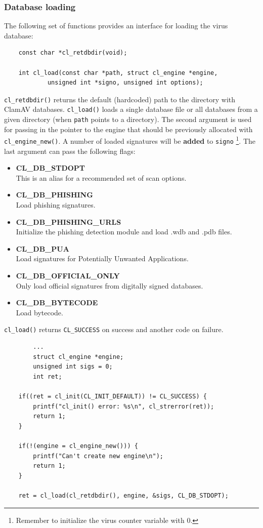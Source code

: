 \documentclass[a4paper,titlepage,12pt]{article}
\begin{document}
    \subsubsection{Database loading}
    The following set of functions provides an interface for loading
    the virus database:
    \begin{verbatim}
	const char *cl_retdbdir(void);

	int cl_load(const char *path, struct cl_engine *engine,
		    unsigned int *signo, unsigned int options);
    \end{verbatim}
    \verb+cl_retdbdir()+ returns the default (hardcoded) path to the directory
    with ClamAV databases.
    \verb+cl_load()+ loads a single database file or all databases from a
    given directory (when \verb+path+ points to a directory). The second
    argument is used for passing in the pointer to the engine that should
    be previously allocated with \verb+cl_engine_new()+. A number of loaded
    signatures will be \textbf{added} to \verb+signo+ \footnote{Remember to
    initialize the virus counter variable with 0.}. The last argument can
    pass the following flags:
    \begin{itemize}
	\item \textbf{CL\_DB\_STDOPT}\\
	This is an alias for a recommended set of scan options.
	\item \textbf{CL\_DB\_PHISHING}\\
	Load phishing signatures.
	\item \textbf{CL\_DB\_PHISHING\_URLS}\\
	Initialize the phishing detection module and load .wdb and .pdb files.
	\item \textbf{CL\_DB\_PUA}\\
	Load signatures for Potentially Unwanted Applications.
	\item \textbf{CL\_DB\_OFFICIAL\_ONLY}\\
	Only load official signatures from digitally signed databases.
	\item \textbf{CL\_DB\_BYTECODE}\\
	Load bytecode.
    \end{itemize}
    \verb+cl_load()+ returns \verb+CL_SUCCESS+ on success and another code on
    failure.
    \begin{verbatim}
	    ...
	    struct cl_engine *engine;
	    unsigned int sigs = 0;
	    int ret;

	if((ret = cl_init(CL_INIT_DEFAULT)) != CL_SUCCESS) {
	    printf("cl_init() error: %s\n", cl_strerror(ret));
	    return 1;
	}

	if(!(engine = cl_engine_new())) {
	    printf("Can't create new engine\n");
	    return 1;
	}

	ret = cl_load(cl_retdbdir(), engine, &sigs, CL_DB_STDOPT);
    \end{verbatim}
\end{document}
